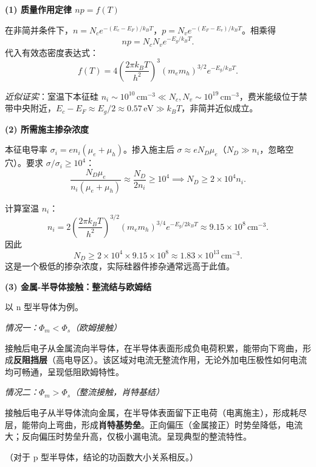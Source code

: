 \begin{derivationbox}[标准解题过程]
\textbf{(1) 质量作用定律 $np=f(T)$}

在非简并条件下，$n=N_ce^{-(E_c-E_F)/k_BT}$，$p=N_ve^{-(E_F-E_v)/k_BT}$。相乘得
\[
np=N_cN_ve^{-E_g/k_BT}.
\]
代入有效态密度表达式：
\begin{equation}
\boxed{f(T)=4\left(\frac{2\pi k_BT}{h^2}\right)^3(m_em_h)^{3/2}e^{-E_g/k_BT}.}
\end{equation}

\textit{近似证实}：室温下本征硅 $n_i\sim10^{10}\,\text{cm}^{-3}\ll N_c,N_v\sim10^{19}\,\text{cm}^{-3}$，费米能级位于禁带中央附近，$E_c-E_F\approx E_g/2\approx0.57\,\text{eV}\gg k_BT$，非简并近似成立。

\textbf{(2) 所需施主掺杂浓度}

本征电导率 $\sigma_i=en_i(\mu_e+\mu_h)$。掺入施主后 $\sigma\approx eN_D\mu_e$（$N_D\gg n_i$，忽略空穴）。要求 $\sigma/\sigma_i\ge10^4$：
\[
\frac{N_D\mu_e}{n_i(\mu_e+\mu_h)}\approx\frac{N_D}{2n_i}\ge10^4\implies N_D\ge2\times10^4n_i.
\]

计算室温 $n_i$：
\[
n_i=2\left(\frac{2\pi k_BT}{h^2}\right)^{3/2}(m_em_h)^{3/4}e^{-E_g/2k_BT}\approx9.15\times10^8\,\text{cm}^{-3}.
\]
因此
\begin{equation}
\boxed{N_D\ge2\times10^4\times9.15\times10^8\approx1.83\times10^{13}\,\text{cm}^{-3}.}
\end{equation}
这是一个极低的掺杂浓度，实际硅器件掺杂通常远高于此值。

\textbf{(3) 金属-半导体接触：整流结与欧姆结}

以 n 型半导体为例。

\textit{情况一：$\Phi_m<\Phi_s$（欧姆接触）}

接触后电子从金属流向半导体，在半导体表面形成负电荷积累，能带向下弯曲，形成\textbf{反阻挡层}（高电导区）。该区域对电流无整流作用，无论外加电压极性如何电流均可畅通，呈现低阻欧姆特性。

\textit{情况二：$\Phi_m>\Phi_s$（整流接触，肖特基结）}

接触后电子从半导体流向金属，在半导体表面留下正电荷（电离施主），形成耗尽层，能带向上弯曲，形成\textbf{肖特基势垒}。正向偏压（金属接正）时势垒降低，电流大；反向偏压时势垒升高，仅极小漏电流。呈现典型的整流特性。

（对于 p 型半导体，结论的功函数大小关系相反。）
\end{derivationbox}

